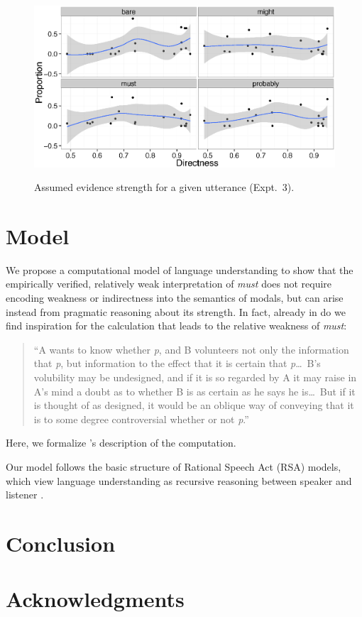 \documentclass[10pt,letterpaper]{article}
\begin{document}
\begin{figure}
	\centering
	{\includegraphics[width=\linewidth]{expt3b.eps}}
	\caption{Assumed evidence strength for a given utterance (Expt.~3).}
	\label{expt3b}
\end{figure}




\section{Model}

We propose a computational model of language understanding to show that the empirically verified, relatively weak interpretation of \textit{must} does not require encoding weakness or indirectness into the semantics of modals, but can  arise instead from pragmatic reasoning about its strength. In fact, already in  do we find inspiration for the calculation that leads to the relative weakness of \emph{must}:

\begin{quotation}
	``A wants to know whether \emph{p}, and B volunteers not only the information that \emph{p}, but information to the effect that it is certain that \emph{p}\ldots\ B's volubility may be undesigned, and if it is so regarded by A it may raise in A's mind a doubt as to whether B is as certain as he says he is\ldots\ But if it is thought of as designed, it would be an oblique way of conveying that it is to some degree controversial whether or not \emph{p}.''
\end{quotation}

\noindent Here, we formalize \citeauthor{grice1989}'s description of the computation. 

Our model follows the basic structure of Rational Speech Act (RSA) models, which view language understanding as recursive reasoning between speaker and listener \cite{frankgoodman2012}.

\section{Conclusion}





\section{Acknowledgments}





\setlength{\bibleftmargin}{.125in}
\setlength{\bibindent}{-\bibleftmargin}


\end{document}
